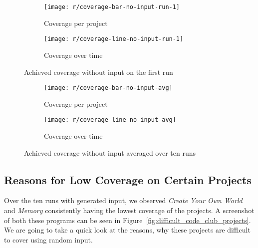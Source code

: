 \begin{figure}[htpb]
    \centering
    \begin{subfigure}{.95\textwidth}
        \texttt{[image: r/coverage-bar-no-input-run-1]}
        \caption{Coverage per project}
        \label{fig:coverage_no_input_bar}
    \end{subfigure}

    \bigskip

    \begin{subfigure}{.95\textwidth}
        \texttt{[image: r/coverage-line-no-input-run-1]}
        \caption{Coverage over time}
        \label{fig:coverage_no_input_line}
    \end{subfigure}

    \caption{Achieved coverage without input on the first run}
    \label{fig:coverage_no_input}
\end{figure}

\begin{figure}[htpb]
    \centering
    \begin{subfigure}{.95\textwidth}
        \texttt{[image: r/coverage-bar-no-input-avg]}
        \caption{Coverage per project}
        \label{fig:coverage_no_input_bar_avg}
    \end{subfigure}

    \bigskip

    \begin{subfigure}{.95\textwidth}
        \texttt{[image: r/coverage-line-no-input-avg]}
        \caption{Coverage over time}
        \label{fig:coverage_no_input_line_avg}
    \end{subfigure}

    \caption{Achieved coverage without input averaged over ten runs}
    \label{fig:coverage_no_input_avg}
\end{figure}

\subsection{Reasons for Low Coverage on Certain Projects}

Over the ten runs with generated input, we observed \textit{Create Your Own World} and \textit{Memory} consistently having the lowest coverage of the projects.
A screenshot of both these programs can be seen in Figure~\ref{fig:difficult_code_club_projects}.
We are going to take a quick look at the reasons, why these projects are difficult to cover using random input.

